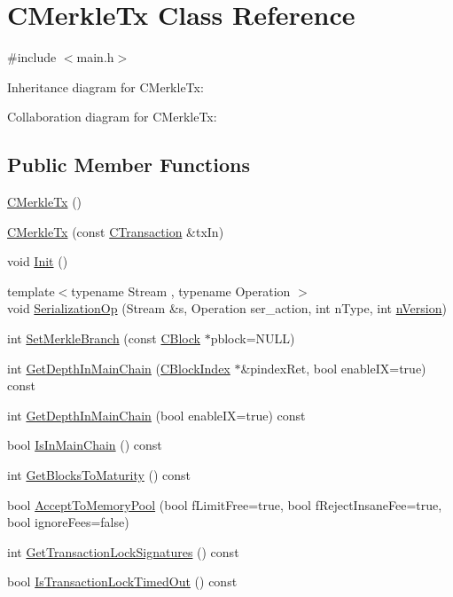 \hypertarget{class_c_merkle_tx}{}\section{C\+Merkle\+Tx Class Reference}
\label{class_c_merkle_tx}


{\ttfamily \#include $<$main.\+h$>$}



Inheritance diagram for C\+Merkle\+Tx\+:


Collaboration diagram for C\+Merkle\+Tx\+:
\subsection*{Public Member Functions}
\begin{DoxyCompactItemize}
\item 
\hyperlink{class_c_merkle_tx_a381bb26e9a8924b8a1311d45dfd18809}{C\+Merkle\+Tx} ()
\item 
\hyperlink{class_c_merkle_tx_aaf4aeddb032c6bb34559fa443bfc3476}{C\+Merkle\+Tx} (const \hyperlink{class_c_transaction}{C\+Transaction} \&tx\+In)
\item 
void \hyperlink{class_c_merkle_tx_ac57628e321f98642976d06b6cc231162}{Init} ()
\item 
{\footnotesize template$<$typename Stream , typename Operation $>$ }\\void \hyperlink{class_c_merkle_tx_afefd3a26c9505f1fa81587c19c22f09c}{Serialization\+Op} (Stream \&s, Operation ser\+\_\+action, int n\+Type, int \hyperlink{class_c_transaction_a6c29bdd822859c7b21b7b6c22dca6825}{n\+Version})
\item 
int \hyperlink{class_c_merkle_tx_a7286c83e09ddaebc6bba39ee38a5a012}{Set\+Merkle\+Branch} (const \hyperlink{class_c_block}{C\+Block} $\ast$pblock=N\+U\+L\+L)
\item 
int \hyperlink{class_c_merkle_tx_a4208943ef656d3787c02ef9973d63f4a}{Get\+Depth\+In\+Main\+Chain} (\hyperlink{class_c_block_index}{C\+Block\+Index} $\ast$\&pindex\+Ret, bool enable\+I\+X=true) const 
\item 
int \hyperlink{class_c_merkle_tx_aa26936095eff1cc6d01b7e2d44cbf8f6}{Get\+Depth\+In\+Main\+Chain} (bool enable\+I\+X=true) const 
\item 
bool \hyperlink{class_c_merkle_tx_adf24748ee829f589ac8d6e99ec6121de}{Is\+In\+Main\+Chain} () const 
\item 
int \hyperlink{class_c_merkle_tx_a8bd25cf06de6a443d0925ec8ba66c949}{Get\+Blocks\+To\+Maturity} () const 
\item 
bool \hyperlink{class_c_merkle_tx_a61126e811a53b941b3efdf5a4e83db90}{Accept\+To\+Memory\+Pool} (bool f\+Limit\+Free=true, bool f\+Reject\+Insane\+Fee=true, bool ignore\+Fees=false)
\item 
int \hyperlink{class_c_merkle_tx_a6782c78aec9fd63e637dbf0668c8506e}{Get\+Transaction\+Lock\+Signatures} () const 
\item 
bool \hyperlink{class_c_merkle_tx_a31b0765b267cab5f76b308d1fe5d9375}{Is\+Transaction\+Lock\+Timed\+Out} () const 
\end{DoxyCompactItemize}

